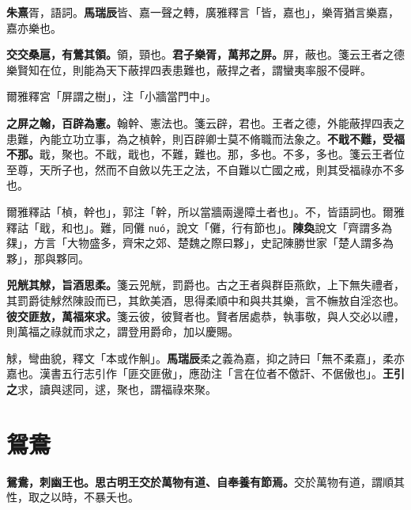 \begin{quoting}\textbf{朱熹}胥，語詞。\textbf{馬瑞辰}皆、嘉一聲之轉，廣雅釋言「皆，嘉也」，樂胥猶言樂嘉，嘉亦樂也。\end{quoting}

\textbf{交交桑扈，有鶯其領。}{\footnotesize 領，頸也。}\textbf{君子樂胥，萬邦之屏。}{\footnotesize 屏，蔽也。箋云王者之德樂賢知在位，則能為天下蔽捍四表患難也，蔽捍之者，謂蠻夷率服不侵畔。}

\begin{quoting}爾雅釋宮「屏謂之樹」，注「小牆當門中」。\end{quoting}

\textbf{之屏之翰，百辟為憲。}{\footnotesize 翰幹、憲法也。箋云辟，君也。王者之德，外能蔽捍四表之患難，內能立功立事，為之楨幹，則百辟卿士莫不脩職而法象之。}\textbf{不戢不難，受福不那。}{\footnotesize 戢，聚也。不戢，戢也，不難，難也。那，多也。不多，多也。箋云王者位至尊，天所子也，然而不自斂以先王之法，不自難以亡國之戒，則其受福祿亦不多也。}

\begin{quoting}爾雅釋詁「楨，幹也」，郭注「幹，所以當牆兩邊障土者也」。不，皆語詞也。爾雅釋詁「戢，和也」。難，同儺 \texttt{nuó}，說文「儺，行有節也」。\textbf{陳奐}說文「齊謂多為㚌」，方言「大物盛多，齊宋之郊、楚魏之際曰夥」，史記陳勝世家「楚人謂多為夥」，那與夥同。\end{quoting}

\textbf{兕觥其觩，旨酒思柔。}{\footnotesize 箋云兕觥，罰爵也。古之王者與群臣燕飲，上下無失禮者，其罰爵徒觩然陳設而已，其飲美酒，思得柔順中和與共其樂，言不幠敖自淫恣也。}\textbf{彼交匪敖，萬福來求。}{\footnotesize 箋云彼，彼賢者也。賢者居處恭，執事敬，與人交必以禮，則萬福之祿就而求之，謂登用爵命，加以慶賜。}

\begin{quoting}觩，彎曲貌，釋文「本或作觓」。\textbf{馬瑞辰}柔之義為嘉，抑之詩曰「無不柔嘉」，柔亦嘉也。漢書五行志引作「匪交匪傲」，應劭注「言在位者不儌訐、不倨傲也」。\textbf{王引之}求，讀與逑同，逑，聚也，謂福祿來聚。\end{quoting}

\section{鴛鴦}


\textbf{鴛鴦，刺幽王也。思古明王交於萬物有道、自奉養有節焉。}{\footnotesize 交於萬物有道，謂順其性，取之以時，不暴夭也。}

